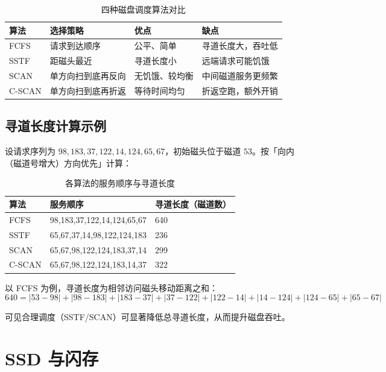 \begin{table}[H]
\centering
\caption{四种磁盘调度算法对比}
\begin{tabulary}{\textwidth}{LLLL}
\toprule
算法 & 选择策略 & 优点 & 缺点 \\
\midrule
FCFS & 请求到达顺序 & 公平、简单 & 寻道长度大，吞吐低 \\
SSTF & 距磁头最近 & 寻道长度小 & 远端请求可能饥饿 \\
SCAN & 单方向扫到底再反向 & 无饥饿、较均衡 & 中间磁道服务更频繁 \\
C-SCAN & 单方向扫到底再折返 & 等待时间均匀 & 折返空跑，额外开销 \\
\bottomrule
\end{tabulary}
\end{table}

\subsection{寻道长度计算示例}

设请求序列为 $98,183,37,122,14,124,65,67$，初始磁头位于磁道 $53$。按「向内（磁道号增大）方向优先」计算：

\begin{table}[H]
\centering
\caption{各算法的服务顺序与寻道长度}
\begin{tabulary}{\textwidth}{LLL}
\toprule
算法 & 服务顺序 & 寻道长度（磁道数） \\
\midrule
FCFS & 98,183,37,122,14,124,65,67 & 640 \\
SSTF & 65,67,37,14,98,122,124,183 & 236 \\
SCAN & 65,67,98,122,124,183,37,14 & 299 \\
C-SCAN & 65,67,98,122,124,183,14,37 & 322 \\
\bottomrule
\end{tabulary}
\end{table}

以 FCFS 为例，寻道长度为相邻访问磁头移动距离之和：
\begin{equation}
640 = |53-98| + |98-183| + |183-37| + |37-122| + |122-14| + |14-124| + |124-65| + |65-67|
\end{equation}

可见合理调度（SSTF/SCAN）可显著降低总寻道长度，从而提升磁盘吞吐。

\section{SSD 与闪存}

